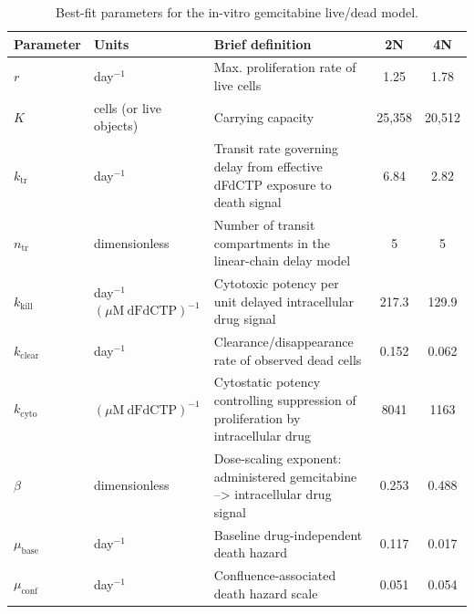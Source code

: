 \documentclass[11pt,notitlepage]{article}
\begin{document}
  \begin{table}[htbp]
  \centering
  \caption{Best-fit parameters for the in-vitro gemcitabine live/dead model.}
  \label{tab:gem_best_fit_parameters}
  \begin{tabular}{llp{6.2cm}cc}
  \toprule
  Parameter & Units & Brief definition & 2N & 4N \\
  \midrule
  \(r\) & day\(^{-1}\) & Max. proliferation rate of live cells & 1.25 & 1.78 \\
  \(K\) & cells (or live objects) & Carrying capacity & 25,358 & 20,512 \\
  \color{blue}\(k_{\mathrm{tr}}\) & \color{blue}day\(^{-1}\) & \color{blue}Transit rate governing delay from effective dFdCTP exposure to death signal & \color{blue}6.84 & \color{blue}2.82 \\
  \color{blue}\(n_{\mathrm{tr}}\) & \color{blue}dimensionless & \color{blue}Number of transit compartments in the linear-chain delay model & \color{blue}5 & \color{blue}5 \\
  \(k_{\mathrm{kill}}\) & day\(^{-1}\)\((\mu\mathrm{M\ dFdCTP})^{-1}\) & Cytotoxic potency per unit delayed intracellular drug signal & 217.3 & 129.9 \\
  \(k_{\mathrm{clear}}\) & day\(^{-1}\) & Clearance/disappearance rate of observed dead cells & 0.152 & 0.062 \\
  \(k_{\mathrm{cyto}}\) & \((\mu\mathrm{M\ dFdCTP})^{-1}\) & Cytostatic potency controlling suppression of proliferation by intracellular drug  & 8041 & 1163 \\
  \(\beta\) & dimensionless & Dose-scaling exponent: administered gemcitabine -->  intracellular drug signal & 0.253 & 0.488 \\
  \(\mu_{\mathrm{base}}\) & day\(^{-1}\) & Baseline drug-independent death hazard & 0.117 & 0.017 \\
  \(\mu_{\mathrm{conf}}\) & day\(^{-1}\) & Confluence-associated death hazard scale & 0.051 & 0.054 \\
  \bottomrule
  \end{tabular}
  \end{table}

  
\clearpage
\end{document}
